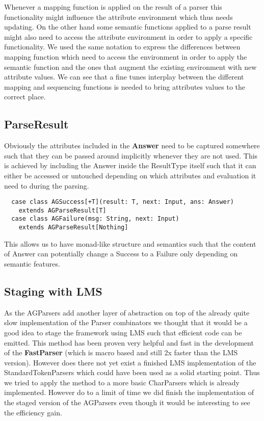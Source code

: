 Whenever a mapping function is applied on the result of a parser this functionality might influence the attribute environment which thus needs updating. On the other hand some semantic functions applied to a parse result might also need to access the attribute environment in order to apply a specific functionality. We used the same notation to express the differences between mapping function which need to access the environment in order to apply the semantic function and the ones that augment the existing environment with new attribute values.
We can see that a fine tunes interplay between the different mapping and sequencing functions is needed to bring attributes values to the correct place.

\subsection{ParseResult}
Obviously the attributes included in the \textbf{Answer} need to be captured somewhere such that they can be passed around implicitly whenever they are not used. This is achieved by including the Answer inside the ResultType itself such that it can either be accessed or untouched depending on which attributes and evaluation it need to during the parsing.

\begin{lstlisting}
  case class AGSuccess[+T](result: T, next: Input, ans: Answer)
    extends AGParseResult[T]
  case class AGFailure(msg: String, next: Input)
    extends AGParseResult[Nothing]
\end{lstlisting}

This allows us to have monad-like structure and semantics such that the content of Answer can potentially change a Success to a Failure only depending on semantic features.

\subsection{Staging with LMS}
As the AGParsers add another layer of abstraction on top of the already quite slow implementation of the Parser combinators we thought that it would be a good idea to stage the framework using LMS such that efficient code can be emitted. This method has been proven very helpful and fast in the development of the \textbf{FastParser}\cite{fastparsers} (which is macro based and still 2x faster than the LMS version).
However does there not yet exist a finished LMS implementation of the StandardTokenParsers which could have been used as a solid starting point. Thus we tried to apply the method to a more basic CharParsers which is already implemented.
However do to a limit of time we did finish the implementation of the staged version of the AGParsers even though it would be interesting to see the efficiency gain.
